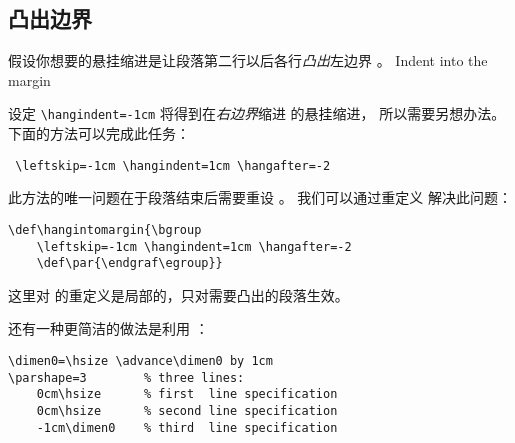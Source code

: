 \documentclass{book}
\begin{document}
\subsection{凸出边界}

假设你想要的悬挂缩进是让段落第二行以后各行{\sl 凸出\/}左边界 \n{1cm}。
\howto Indent into the margin\par
设定 \verb/\hangindent=-1cm/ 将得到在{\sl 右边界\/}缩进 \n{1cm} 的悬挂缩进，
所以需要另想办法。下面的方法可以完成此任务：
\begin{verbatim}
 \leftskip=-1cm \hangindent=1cm \hangafter=-2
\end{verbatim}
此方法的唯一问题在于段落结束后需要重设 。
我们可以通过重定义  解决此问题：
\begin{verbatim}
\def\hangintomargin{\bgroup
    \leftskip=-1cm \hangindent=1cm \hangafter=-2
    \def\par{\endgraf\egroup}}
\end{verbatim}
这里对  的重定义是局部的，只对需要凸出的段落生效。

% 
还有一种更简洁的做法是利用 ：
\begin{verbatim}
\dimen0=\hsize \advance\dimen0 by 1cm
\parshape=3        % three lines:
    0cm\hsize      % first  line specification
    0cm\hsize      % second line specification
    -1cm\dimen0    % third  line specification
\end{verbatim}
\end{document}
